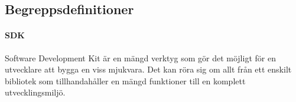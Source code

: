 \subsection{Begreppsdefinitioner}

\paragraph{SDK} Software Development Kit är en mängd verktyg som gör det möjligt för en utvecklare att bygga en viss mjukvara. Det kan röra sig om allt från ett enskilt bibliotek som tillhandahåller en mängd funktioner till en komplett utvecklingsmiljö.